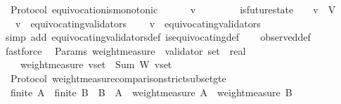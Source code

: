 \begin{isabellebody}
\endisatagproof
{\isafoldproof}%
%
\isadelimproof
\isanewline
%
\endisadelimproof
\isanewline
{}\isamarkupfalse%
\ {\isacharparenleft}\ Protocol{\isacharparenright}\ equivocation{\isacharunderscore}is{\isacharunderscore}monotonic\ {\isacharcolon}\isanewline
\ \ {\isachardoublequoteopen}{\isasymforall}\ {\isasymsigma}\ {\isasymsigma}{\isacharprime}\ v{\isachardot}\ {\isasymsigma}\ {\isasymin}\ {\isasymSigma}\ {\isasymand}\ {\isasymsigma}{\isacharprime}\ {\isasymin}\ {\isasymSigma}\ {\isasymand}\ is{\isacharunderscore}future{\isacharunderscore}state\ {\isacharparenleft}{\isasymsigma}{\isacharcomma}\ {\isasymsigma}{\isacharprime}{\isacharparenright}\ {\isasymand}\ v\ {\isasymin}\ V\isanewline
\ \ {\isasymlongrightarrow}\ v\ {\isasymin}\ equivocating{\isacharunderscore}validators\ {\isasymsigma}\isanewline
\ \ {\isasymlongrightarrow}\ v\ {\isasymin}\ equivocating{\isacharunderscore}validators\ {\isasymsigma}{\isacharprime}{\isachardoublequoteclose}\isanewline
%
\isadelimproof
\ \ %
\endisadelimproof
%
\isatagproof
{}\isamarkupfalse%
\ {\isacharparenleft}simp\ add{\isacharcolon}\ equivocating{\isacharunderscore}validators{\isacharunderscore}def\ is{\isacharunderscore}equivocating{\isacharunderscore}def{\isacharparenright}\isanewline
\ \ \isamarkupfalse%
\ observed{\isacharunderscore}def\ \isamarkupfalse%
\ fastforce%
\endisatagproof
{\isafoldproof}%
%
\isadelimproof
\isanewline
%
\endisadelimproof
\isanewline
\isanewline
\isanewline
\isanewline
\isanewline
\isanewline
{}\isamarkupfalse%
\ {\isacharparenleft}\ Params{\isacharparenright}\ weight{\isacharunderscore}measure\ {\isacharcolon}{\isacharcolon}\ {\isachardoublequoteopen}validator\ set\ {\isasymRightarrow}\ real{\isachardoublequoteclose}\isanewline
\ \ \isanewline
\ \ \ \ \isanewline
\ \ \ \ {\isachardoublequoteopen}weight{\isacharunderscore}measure\ v{\isacharunderscore}set\ {\isacharequal}\ Sum\ {\isacharparenleft}W\ {\isacharbackquote}v{\isacharunderscore}set{\isacharparenright}{\isachardoublequoteclose}\isanewline
\isanewline
{}\isamarkupfalse%
\ {\isacharparenleft}\ Protocol{\isacharparenright}\ weight{\isacharunderscore}measure{\isacharunderscore}comparison{\isacharunderscore}strict{\isacharunderscore}subset{\isacharunderscore}gte\ {\isacharcolon}\isanewline
\ \ {\isachardoublequoteopen}finite\ A\ {\isasymLongrightarrow}\ finite\ B\ {\isasymLongrightarrow}\ B\ {\isasymsubseteq}\ A\ {\isasymLongrightarrow}\ weight{\isacharunderscore}measure\ A\ {\isasymge}\ weight{\isacharunderscore}measure\ B{\isachardoublequoteclose}\isanewline

\end{isabellebody}
